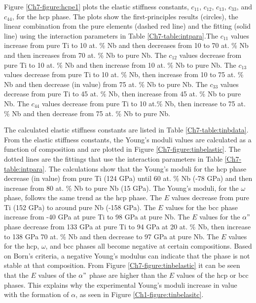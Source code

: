 Figure \ref{Ch7-figure:hcpe1} plots the elastic stiffness constants, $c_{11}$, $c_{12}$, $c_{13}$, $c_{33}$, and $c_{44}$, for the hcp phase. The plots show the first-principles results (circles), the linear combination from the pure elements (dashed red line) and the fitting (solid line) using the interaction parameters in Table \ref{Ch7-table:intpara}.The $c_{11}$ values increase from pure Ti to 10 at. \% Nb and then decreases from 10 to 70 at. \% Nb and then increases from 70 at. \% Nb to pure Nb. The $c_{12}$ values decrease from pure Ti to 10 at. \% Nb and then increase from 10 at. \% Nb to pure Nb. The $c_{13}$ values decrease from pure Ti to 10 at. \% Nb, then increase from 10 to 75 at. \% Nb and then decrease (in value) from 75 at. \% Nb to pure Nb. The $c_{33}$ values decrease from pure Ti to 45 at. \% Nb, then increase from 45 at. \% Nb to pure Nb. The $c_{44}$ values decrease from pure Ti to 10 at.\% Nb, then increase to 75 at. \% Nb and then decrease from 75 at. \% Nb to pure Nb.

The calculated elastic stiffness constants are listed in Table \ref{Ch7-table:tinbdata}. From the elastic stiffness constants, the Young's moduli values are calculated as a function of composition and are plotted in Figure \ref{Ch7-figure:tinbelastic}. The dotted lines are the fittings that use the interaction parameters in Table \ref{Ch7-table:intpara}. The calculations show that the Young's moduli for the hcp phase decrease (in value) from pure Ti (124 GPa) until 60 at. \% Nb (-78 GPa) and then increase from 80 at. \% Nb to pure Nb (15 GPa). The Young's moduli, for the $\omega$ phase, follows the same trend as the hcp phase. The $E$ values decrease from pure Ti (152 GPa) to around pure Nb (-158 GPa). The $E$ values for the bcc phase increase from -40 GPa at pure Ti to 98 GPa at pure Nb. The $E$ values for the $\alpha"$ phase decrease from 133 GPa at pure Ti to 94 GPa at 20 at. \% Nb, then increase to 138 GPa 70 at. \% Nb and then decrease to 97 GPa at pure Nb. The $E$ values for the hcp, $\omega$, and bcc phases all become negative at certain compositions. Based on Born's criteria, a negative Young's modulus can indicate that the phase is not stable at that composition. From Figure \ref{Ch7-figure:tinbelastic} it can be seen that the $E$ values of the $\alpha"$ phase are higher than the $E$ values of the hcp or bcc phases. This explains why the experimental Young's moduli increase in value with the formation of $\alpha$, as seen in Figure \ref{Ch1-figure:tinbelasitc}. 

